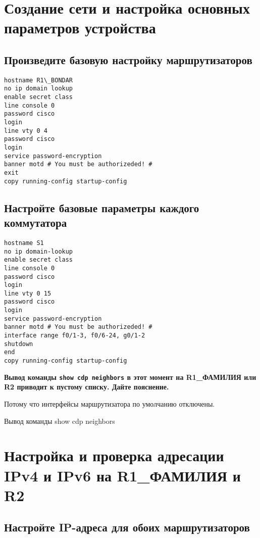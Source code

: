 \section{Создание сети и настройка основных параметров устройства}

\subsection{Произведите базовую настройку маршрутизаторов}

\begin{verbatim}
hostname R1\_BONDAR
no ip domain lookup
enable secret class
line console 0
password cisco
login
line vty 0 4
password cisco
login
service password-encryption
banner motd # You must be authorizeded! #
exit
copy running-config startup-config
\end{verbatim}

\subsection{Настройте базовые параметры каждого коммутатора}

\begin{verbatim}
hostname S1
no ip domain-lookup
enable secret class
line console 0
password cisco
login
line vty 0 15
password cisco
login
service password-encryption
banner motd # You must be authorizeded! #
interface range f0/1-3, f0/6-24, g0/1-2
shutdown
end
copy running-config startup-config
\end{verbatim}

\textbf{Вывод команды \texttt{show cdp neighbors} в этот момент
на R1\_ФАМИЛИЯ или R2 приводит к пустому списку. Дайте пояснение.}

Потому что интерфейсы маршрутизатора по умолчанию отключены.

\begin{image}
	\caption{Вывод команды show cdp neighbors}
\end{image}

\section{Настройка и проверка адресации IPv4 и IPv6 на R1\_ФАМИЛИЯ и R2}

\subsection{Настройте IP-адреса для обоих маршрутизаторов}

